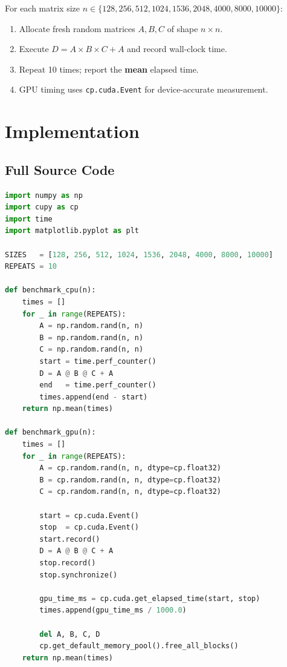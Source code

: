 \documentclass[12pt, a4paper]{article}
\begin{document}
\begin{infobox}
For each matrix size $n \in \{128, 256, 512, 1024, 1536, 2048, 4000, 8000, 10000\}$:
\begin{enumerate}[leftmargin=1.4em, itemsep=2pt]
  \item Allocate fresh random matrices $A, B, C$ of shape $n \times n$.
  \item Execute $D = A \times B \times C + A$ and record wall-clock time.
  \item Repeat 10 times; report the \textbf{mean} elapsed time.
  \item GPU timing uses \texttt{cp.cuda.Event} for device-accurate measurement.
\end{enumerate}
\end{infobox}

\clearpage
\section{Implementation}

\subsection{Full Source Code}

\begin{lstlisting}[language=Python, caption={Complete benchmarking script}]
import numpy as np
import cupy as cp
import time
import matplotlib.pyplot as plt

SIZES   = [128, 256, 512, 1024, 1536, 2048, 4000, 8000, 10000]
REPEATS = 10

def benchmark_cpu(n):
    times = []
    for _ in range(REPEATS):
        A = np.random.rand(n, n)
        B = np.random.rand(n, n)
        C = np.random.rand(n, n)
        start = time.perf_counter()
        D = A @ B @ C + A
        end   = time.perf_counter()
        times.append(end - start)
    return np.mean(times)

def benchmark_gpu(n):
    times = []
    for _ in range(REPEATS):
        A = cp.random.rand(n, n, dtype=cp.float32)
        B = cp.random.rand(n, n, dtype=cp.float32)
        C = cp.random.rand(n, n, dtype=cp.float32)

        start = cp.cuda.Event()
        stop  = cp.cuda.Event()
        start.record()
        D = A @ B @ C + A
        stop.record()
        stop.synchronize()

        gpu_time_ms = cp.cuda.get_elapsed_time(start, stop)
        times.append(gpu_time_ms / 1000.0)

        del A, B, C, D
        cp.get_default_memory_pool().free_all_blocks()
    return np.mean(times)
\end{lstlisting}
\end{document}
